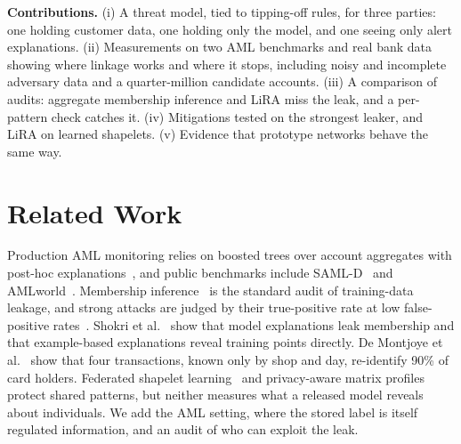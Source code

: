\documentclass[sigconf,anonymous]{acmart}
\begin{document}
\textbf{Contributions.} (i) A threat model, tied to tipping-off rules, for three parties: one holding customer data, one holding only the model, and one seeing only alert explanations. (ii) Measurements on two AML benchmarks and real bank data showing where linkage works and where it stops, including noisy and incomplete adversary data and a quarter-million candidate accounts. (iii) A comparison of audits: aggregate membership inference and LiRA miss the leak, and a per-pattern check catches it. (iv) Mitigations tested on the strongest leaker, and LiRA on learned shapelets. (v) Evidence that prototype networks behave the same way.

\section{Related Work}
Production AML monitoring relies on boosted trees over account aggregates with post-hoc explanations~\cite{tertychnyi2022}, and public benchmarks include SAML-D~\cite{samld} and AMLworld~\cite{amlworld}. Membership inference~\cite{shokri2017} is the standard audit of training-data leakage, and strong attacks are judged by their true-positive rate at low false-positive rates~\cite{carlini2022}. Shokri et al.~\cite{shokri2021} show that model explanations leak membership and that example-based explanations reveal training points directly. De Montjoye et al.~\cite{demontjoye2015} show that four transactions, known only by shop and day, re-identify 90\% of card holders. Federated shapelet learning~\cite{fedst} and privacy-aware matrix profiles~\cite{pmp} protect shared patterns, but neither measures what a released model reveals about individuals. We add the AML setting, where the stored label is itself regulated information, and an audit of who can exploit the leak.
\end{document}
